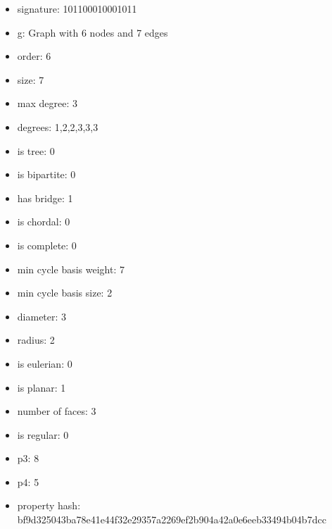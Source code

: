 \begin{itemize}
\item signature: 101100010001011
\item g: Graph with 6 nodes and 7 edges
\item order: 6
\item size: 7
\item max degree: 3
\item degrees: 1,2,2,3,3,3
\item is tree: 0
\item is bipartite: 0
\item has bridge: 1
\item is chordal: 0
\item is complete: 0
\item min cycle basis weight: 7
\item min cycle basis size: 2
\item diameter: 3
\item radius: 2
\item is eulerian: 0
\item is planar: 1
\item number of faces: 3
\item is regular: 0
\item p3: 8
\item p4: 5
\item property hash: bf9d325043ba78e41e44f32e29357a2269ef2b904a42a0e6eeb33494b04b7dcc
\end{itemize}
\newpage
\begin{figure}
\end{figure}
